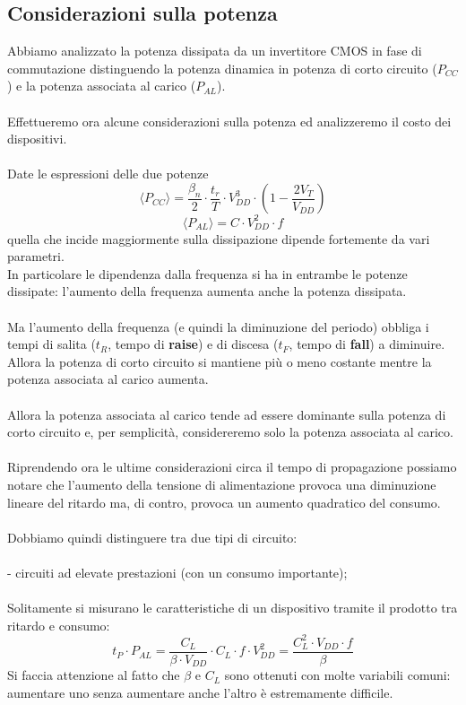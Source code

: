 \documentclass[../main.tex]{subfiles}
\begin{document}
	\subsection{Considerazioni sulla potenza}
	Abbiamo analizzato la potenza dissipata da un invertitore CMOS in fase di commutazione distinguendo la potenza dinamica in potenza di corto circuito ($P_{CC}$) e la potenza associata al carico ($P_{AL}$).\\\\
	Effettueremo ora alcune considerazioni sulla potenza ed analizzeremo il costo dei dispositivi.\\\\
	Date le espressioni delle due potenze
	$$\langle P_{CC} \rangle = \frac{\beta_n}{2} \cdot \frac{t_r}{T} \cdot V_{DD}^3 \cdot \left(1 - \frac{2V_T}{V_{DD}}\right)$$
	$$\langle P_{AL} \rangle = C \cdot V_{DD}^2 \cdot f$$
	quella che incide maggiormente sulla dissipazione dipende fortemente da vari parametri.\\
	In particolare le dipendenza dalla frequenza si ha in entrambe le potenze dissipate: l'aumento della frequenza aumenta anche la potenza dissipata.\\\\
	Ma l'aumento della frequenza (e quindi la diminuzione del periodo) obbliga i tempi di salita ($t_R$, tempo di \textbf{raise}) e di discesa ($t_F$, tempo di \textbf{fall}) a diminuire.\\
	Allora la potenza di corto circuito si mantiene più o meno costante mentre la potenza associata al carico aumenta.\\\\
	Allora la potenza associata al carico tende ad essere dominante sulla potenza di corto circuito e, per semplicità, considereremo solo la potenza associata al carico.\\\\
	Riprendendo ora le ultime considerazioni circa il tempo di propagazione possiamo notare che l'aumento della tensione di alimentazione provoca una diminuzione lineare del ritardo ma, di contro, provoca un aumento quadratico del consumo.\\\\
	Dobbiamo quindi distinguere tra due tipi di circuito:\\\\
	- circuiti ad elevate prestazioni (con un consumo importante);\\\\
	Solitamente si misurano le caratteristiche di un dispositivo tramite il prodotto tra ritardo e consumo:
	$$t_P \cdot P_{AL} = \frac{C_L}{\beta \cdot V_{DD}} \cdot C_L \cdot f \cdot V_{DD}^2 = \frac{C_L^2 \cdot V_{DD} \cdot f}{\beta}$$
	Si faccia attenzione al fatto che $\beta$ e $C_L$ sono ottenuti con molte variabili comuni: aumentare uno senza aumentare anche l'altro è estremamente difficile.
\end{document}
